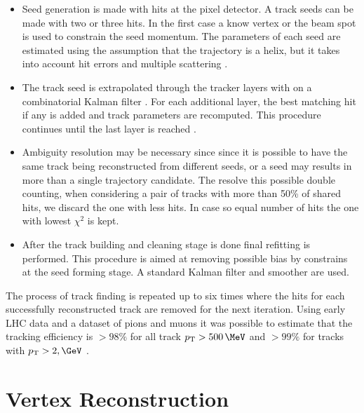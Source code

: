 \begin{itemize}
  \item Seed generation is made with hits at the pixel detector. A track seeds can be made with two or three hits. In the first case a know vertex or the beam spot is used to constrain the seed momentum. The parameters of each seed are estimated using the assumption that the trajectory is a helix, but it takes into account hit errors and multiple scattering \cite{ARTICLE:CMSTrackReconstructionSeedGeneration}.
  \item The track seed is extrapolated through the tracker layers with on a combinatorial Kalman filter \cite{ARTICLE:KalmanFilteringTrackVertexFitting} . For each additional layer, the best matching hit if any is added and track parameters are recomputed. This procedure continues until the last layer is reached \cite{ARTICLE:CMSTrackReconstruction}.
  \item Ambiguity resolution may be necessary since since it is possible to have the same track being reconstructed from different seeds, or a seed may results in more than a single trajectory candidate. The resolve this possible double counting, when considering a pair of tracks with more than 50\% of shared hits, we discard the one with less hits. In case so equal number of hits the one with lowest $\chi^2$ is kept. 
  \item After the track building and cleaning stage is done final refitting is performed. This procedure is aimed at removing possible bias by constrains at the seed forming stage. A standard Kalman filter and smoother are used.
\end{itemize}

The process of track finding is repeated up to six times where the hits for each successfully reconstructed track are removed for the next iteration. Using early \gls{LHC} data and a dataset of pions and muons it was possible to estimate that the tracking efficiency is $>98\%$ for all track $\pt > 500\,\MeV$ and $>99\%$ for tracks with $\pt > 2,\GeV$ \cite{ARTICLE:CMSMeasurmentTrackEfficiency}.

\section{Vertex Reconstruction}
\label{SECTION:EventReconstructionPhysicsObjects_Vertex}

